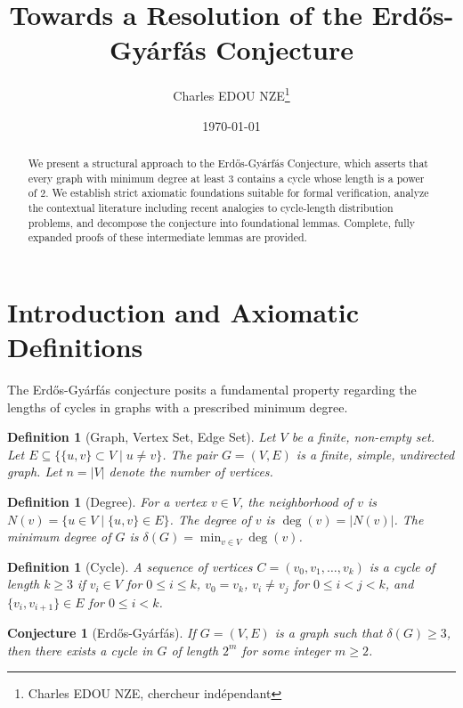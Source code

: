 \documentclass[11pt,a4paper]{article}
\title{Towards a Resolution of the Erd\H{o}s-Gy\'arf\'as Conjecture}
\author{Charles EDOU NZE\thanks{Charles EDOU NZE, chercheur ind\'ependant}}
\date{\today}
\newtheorem{definition}[theorem]{Definition}
\newtheorem{conjecture}[theorem]{Conjecture}
\begin{document}
\maketitle

\begin{abstract}
We present a structural approach to the Erd\H{o}s-Gy\'arf\'as Conjecture, which asserts that every graph with minimum degree at least $3$ contains a cycle whose length is a power of $2$. We establish strict axiomatic foundations suitable for formal verification, analyze the contextual literature including recent analogies to cycle-length distribution problems, and decompose the conjecture into foundational lemmas. Complete, fully expanded proofs of these intermediate lemmas are provided.
\end{abstract}

\section{Introduction and Axiomatic Definitions}

The Erd\H{o}s-Gy\'arf\'as conjecture posits a fundamental property regarding the lengths of cycles in graphs with a prescribed minimum degree.

\begin{definition}[Graph, Vertex Set, Edge Set]
Let $V$ be a finite, non-empty set. Let $E \subseteq \{ \{u, v\} \subset V \mid u \neq v \}$. The pair $G = (V, E)$ is a finite, simple, undirected graph. Let $n = |V|$ denote the number of vertices.
\end{definition}

\begin{definition}[Degree]
For a vertex $v \in V$, the neighborhood of $v$ is $N(v) = \{u \in V \mid \{u, v\} \in E\}$. The degree of $v$ is $\deg(v) = |N(v)|$. The minimum degree of $G$ is $\delta(G) = \min_{v \in V} \deg(v)$.
\end{definition}

\begin{definition}[Cycle]
A sequence of vertices $C = (v_0, v_1, \dots, v_k)$ is a cycle of length $k \ge 3$ if $v_i \in V$ for $0 \le i \le k$, $v_0 = v_k$, $v_i \neq v_j$ for $0 \le i < j < k$, and $\{v_i, v_{i+1}\} \in E$ for $0 \le i < k$.
\end{definition}

\begin{conjecture}[Erd\H{o}s-Gy\'arf\'as]
If $G = (V, E)$ is a graph such that $\delta(G) \ge 3$, then there exists a cycle in $G$ of length $2^m$ for some integer $m \ge 2$.
\end{conjecture}
\end{document}
